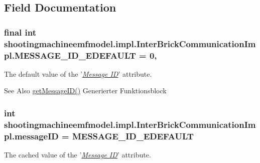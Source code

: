 \subsection{Field Documentation}
\hypertarget{classshootingmachineemfmodel_1_1impl_1_1_inter_brick_communication_impl_a7bc71e77fb5709025d118e5488d34663}{
\subsubsection[{M\-E\-S\-S\-A\-G\-E\-\_\-\-I\-D\-\_\-\-E\-D\-E\-F\-A\-U\-L\-T}]{\setlength{\rightskip}{0pt plus 5cm}final int shootingmachineemfmodel.\-impl.\-Inter\-Brick\-Communication\-Impl.\-M\-E\-S\-S\-A\-G\-E\-\_\-\-I\-D\-\_\-\-E\-D\-E\-F\-A\-U\-L\-T = 0\hspace{0.3cm}{\ttfamily [static]}, {\ttfamily [protected]}}}\label{classshootingmachineemfmodel_1_1impl_1_1_inter_brick_communication_impl_a7bc71e77fb5709025d118e5488d34663}
The default value of the '\hyperlink{classshootingmachineemfmodel_1_1impl_1_1_inter_brick_communication_impl_ace5e994ef218bf1074d002ebaef563b0}{{\itshape Message I\-D}}' attribute.

\begin{DoxySeeAlso}{See Also}
\hyperlink{classshootingmachineemfmodel_1_1impl_1_1_inter_brick_communication_impl_ace5e994ef218bf1074d002ebaef563b0}{get\-Message\-I\-D()} Generierter Funktionsblock  
\end{DoxySeeAlso}
\hypertarget{classshootingmachineemfmodel_1_1impl_1_1_inter_brick_communication_impl_a2b87fd3de3c67ba80aafb38cb48fd455}{
\subsubsection[{message\-I\-D}]{\setlength{\rightskip}{0pt plus 5cm}int shootingmachineemfmodel.\-impl.\-Inter\-Brick\-Communication\-Impl.\-message\-I\-D = {\bf M\-E\-S\-S\-A\-G\-E\-\_\-\-I\-D\-\_\-\-E\-D\-E\-F\-A\-U\-L\-T}\hspace{0.3cm}{\ttfamily [protected]}}}\label{classshootingmachineemfmodel_1_1impl_1_1_inter_brick_communication_impl_a2b87fd3de3c67ba80aafb38cb48fd455}
The cached value of the '\hyperlink{classshootingmachineemfmodel_1_1impl_1_1_inter_brick_communication_impl_ace5e994ef218bf1074d002ebaef563b0}{{\itshape Message I\-D}}' attribute.


